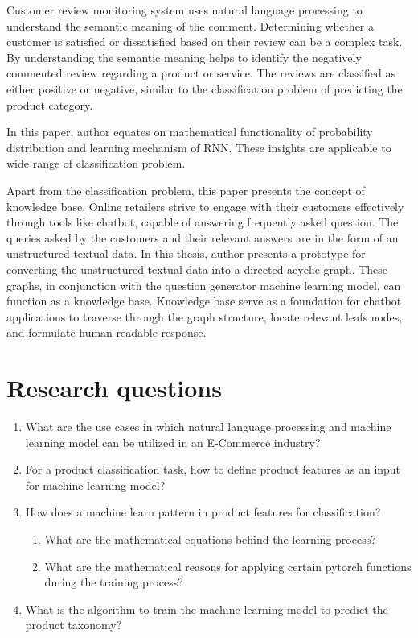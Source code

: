  Customer review monitoring system uses natural language processing to understand the semantic meaning of the comment. Determining whether a customer is satisfied or dissatisfied based on their review can be a complex task. By understanding the semantic meaning helps to identify the negatively commented review regarding a product or service. The reviews are classified as either positive or negative, similar to the classification problem of predicting the product category. 
 
 In this paper, author equates on mathematical functionality of probability distribution and learning mechanism of \acl*{RNN}. These insights are applicable to wide range of classification problem.

 Apart from the classification problem, this paper presents the concept of knowledge base. Online retailers strive to engage with their customers effectively through tools like chatbot, capable of  answering frequently asked question. The queries asked by the customers and their relevant answers are in the form of an unstructured textual data. In this thesis, author presents a prototype for converting the unstructured textual data into a directed acyclic graph. These graphs, in conjunction with the question generator machine learning model,  can function as a knowledge base. Knowledge base serve as a foundation for chatbot applications to traverse through the graph structure, locate relevant leafs nodes, and formulate human-readable response.

\section{Research questions}

\begin{enumerate}[label=\textbf{RQ\arabic*:}]
    \item What are the use cases in which natural language processing and machine learning model can be utilized in an E-Commerce industry?
   
    
    \item For a product classification task, how to define product features as an input for machine learning model?
    
    \item How does a machine learn pattern in product features for classification?
    

    \begin{enumerate}[label=\textbf{SRQ\arabic*:}]
        \item What are the mathematical equations behind the learning process?
    
        
        \item What are the mathematical reasons for applying certain pytorch functions during the training process? 
        
         

    \end{enumerate}
    
    \item What is the algorithm to train the machine learning model to predict the product taxonomy?
  

  \end{enumerate}

